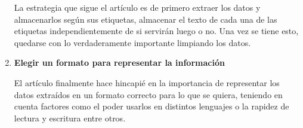 \begin{enumerate}
    La estrategia que sigue el artículo es de primero extraer los datos y
    almacenarlos según sus etiquetas, almacenar el texto de cada una de las
    etiquetas independientemente de si servirán luego o no. Una vez se tiene
    esto, quedarse con lo verdaderamente importante limpiando los datos.

    \item \textbf{Elegir un formato para representar la información}
    
    El artículo finalmente hace hincapié en la importancia de representar los
    datos extraídos en un formato correcto para lo que se quiera, teniendo en
    cuenta factores como el poder usarlos en distintos lenguajes o la rapidez de
    lectura y escritura entre otros.
\end{enumerate}

